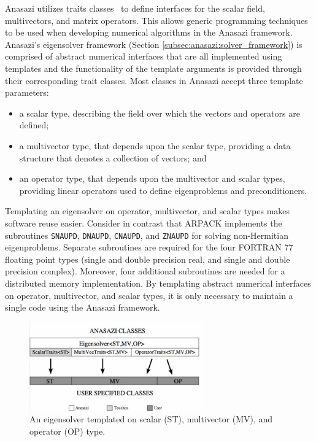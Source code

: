 \documentclass[acmtoms]{acmtrans2m}
\newcounter{algorithm}
\begin{document}
Anasazi utilizes traits classes~\cite{myer:95,veld:96} to define interfaces for the scalar field,
multivectors, and matrix operators. This allows generic programming techniques to
be used when developing numerical algorithms in the Anasazi framework.  
Anasazi's eigensolver framework (Section  
\ref{subsec:anasazi:solver_framework}) is comprised of abstract numerical interfaces
that are all implemented using templates and the functionality of the 
template arguments is provided through their corresponding trait classes.
Most classes in Anasazi accept
three template parameters:
\begin{itemize}
\item
a scalar type, describing the field over which the vectors and
operators are defined;
\item
a multivector type, that depends upon the scalar type, providing a
data structure that denotes a collection of vectors; and
\item
an operator type, that depends upon the multivector and scalar types,
providing linear operators used to define eigenproblems and
preconditioners.
\end{itemize}

Templating an eigensolver on operator, multivector, and scalar types makes software reuse
easier. Consider in contrast that ARPACK implements the subroutines \texttt{SNAUPD},
\texttt{DNAUPD}, \texttt{CNAUPD}, and \texttt{ZNAUPD} for solving non-Hermitian
eigenproblems. Separate subroutines are required for the four FORTRAN 77 floating
point types (single and double precision real, and single and double precision complex).
Moreover, four additional subroutines are needed for a distributed memory implementation.
By templating abstract numerical interfaces on operator, multivector, and scalar types, 
it is only necessary to maintain a single code using the Anasazi framework.

\begin{figure}[htb]
\label{fig:latemplate}
\begin{center}
\includegraphics[height=1.5in]{anasazi_linalg_template}
\end{center}
\caption{An eigensolver templated on scalar (ST), multivector (MV), and
operator (OP) type.}
\end{figure}
\end{document}
